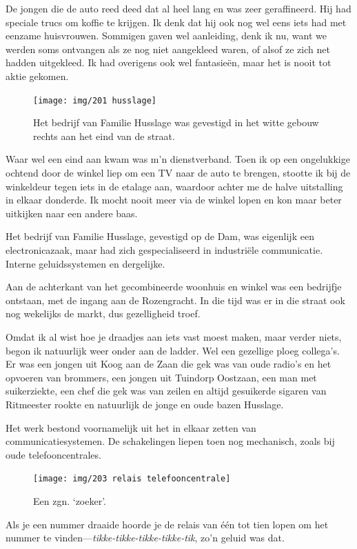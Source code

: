 \documentclass[10pt,twoside, openright]{memoir}
\begin{document}
De jongen die de auto reed deed dat al heel lang en was zeer geraffineerd. Hij had speciale trucs om koffie te krijgen. Ik denk dat hij ook nog wel eens iets had met eenzame huisvrouwen. Sommigen gaven wel aanleiding, denk ik nu, want we werden soms ontvangen als ze nog niet aangekleed waren, of alsof ze zich net hadden uitgekleed. Ik had overigens ook wel fantasieën, maar het is nooit tot aktie gekomen. 

\begin{figure}
\texttt{[image: img/201 husslage]}
\caption*{\footnotesize Het bedrijf van Familie Husslage was gevestigd in het witte gebouw rechts aan het eind van de straat.}
\end{figure}

Waar wel een eind aan kwam was m’n dienstverband. Toen ik op een ongelukkige ochtend door de winkel liep om een TV naar de auto te brengen, stootte ik bij de winkeldeur tegen iets in de etalage aan, waardoor achter me de halve uitstalling in elkaar donderde. Ik mocht nooit meer via de winkel lopen en kon maar beter uitkijken naar een andere baas.

Het bedrijf van Familie Husslage, gevestigd op de Dam, was eigenlijk een electronicazaak, maar had zich gespecialiseerd in industriële communicatie. Interne geluidssystemen en dergelijke. 

Aan de achterkant van het gecombineerde woonhuis en winkel was een bedrijfje ontstaan, met de ingang aan de Rozengracht. In die tijd was er in die straat ook nog wekelijks de markt, dus gezelligheid troef. 

Omdat ik al wist hoe je draadjes aan iets vast moest maken, maar verder niets, begon ik natuurlijk weer onder aan de ladder. Wel een gezellige ploeg collega’s. Er was een jongen uit Koog aan de Zaan die gek was van oude radio’s en het opvoeren van brommers, een jongen uit Tuindorp Oostzaan, een man met suikerziekte, een chef die gek was van zeilen en altijd gesuikerde sigaren van Ritmeester rookte en natuurlijk de jonge en oude bazen Husslage. 

Het werk bestond voornamelijk uit het in elkaar zetten van communicatiesystemen. De schakelingen liepen toen nog mechanisch, zoals bij oude telefooncentrales. 

\begin{figure}
\texttt{[image: img/203 relais telefooncentrale]}
\caption*{\footnotesize Een zgn. ‘zoeker’.}
\end{figure}

Als je een nummer draaide hoorde je de relais van één tot tien lopen om het nummer te vinden---\emph{tikke-tikke-tikke-tikke-tik}, zo’n geluid was dat. 
\end{document}
